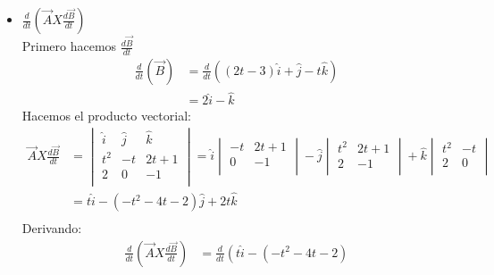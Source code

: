 \documentclass[12pt,openany]{book}
\begin{document}
\begin{itemize}
					\item $\frac{d}{dt}\left(\vec{A}X\frac{d\vec{B}}{dt}\right)$\\
					Primero hacemos $\frac{d\vec{B}}{dt}$
					\begin{equation*}
						\begin{split}
							\frac{d}{dt}(\vec{B})&=\frac{d}{dt}\left((2t-3)\hat{i}+\hat{j}-t\hat{k}\right)			\\
												 &=2\hat{i}-\hat{k}
						\end{split}
					\end{equation*}
					Hacemos el producto vectorial:
					\begin{equation*}
						\begin{split}
							\vec{A}X\frac{d\vec{B}}{dt}&=\begin{vmatrix}
						 									\hat{i} & \hat{j} & \hat{k} 	\\
						 									   t^{2}  &   -t    &    2t+1   \\
						 									     2    &    0    &     -1   	\\    
						 								\end{vmatrix}
						 								=\hat{i}\begin{vmatrix}
						 	    										-t & 2t+1 			\\
						 	    										 0 &  -1  			\\
						 	    								\end{vmatrix}			
						 	    						-\hat{j}\begin{vmatrix}
						 	    									t^{2} & 2t+1 		\\
						 	    									   2  &  -1 		\\
						 	    								\end{vmatrix}
						 	    						+\hat{k}\begin{vmatrix}
						 	    									t^{2} & -t 			\\
						 	    									  2   &  0 			\\
						 	    								\end{vmatrix}			\\
						 	    					   &=t\hat{i}-(-t^{2}-4t-2)\hat{j}+2t\hat{k}	\\
						\end{split}
					\end{equation*}
					Derivando:
					\begin{equation*}
						\begin{split}
							\frac{d}{dt}\left(\vec{A}X\frac{d\vec{B}}{dt}\right)&=\frac{d}{dt}\left(t\hat{i}-(-t^{2}-4t-2)

\end{split}
\end{equation*}
\end{itemize}
\end{document}
